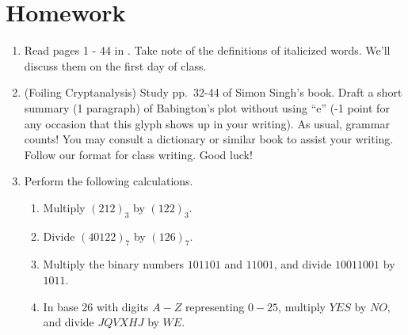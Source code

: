 \section{Homework}

\begin{enumerate}
\item Read pages 1 - 44 in \cite{Singh}.  Take note of the definitions of italicized words.  We'll discuss them on the first day of class.

\item (Foiling Cryptanalysis) Study pp.\ 32-44 of Simon Singh's book.  Draft a short summary (1 paragraph) of Babington's plot without using ``e'' (-1 point for any occasion that this glyph shows up in your writing). As usual, grammar counts! You may consult a dictionary or similar book to assist your writing.  Follow our format for class writing.  Good luck!
\item Perform the following calculations.
\begin{enumerate}
\item Multiply $(212)_3$ by $(122)_3$.
\item Divide $(40122)_7$ by $(126)_7$.
\item Multiply the binary numbers $101101$ and $11001$, and divide $10011001$ by $1011$.
\item In base 26 with digits $A - Z$ representing $0 - 25$, multiply $YES$ by $NO$, and divide $JQVXHJ$ by $WE$.
\end{enumerate}
\end{enumerate}

